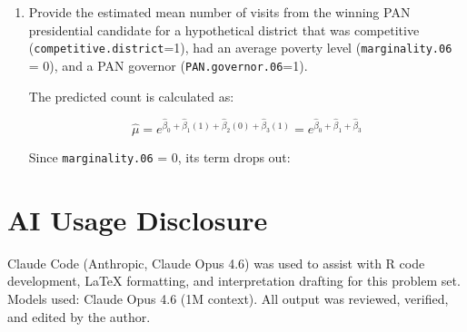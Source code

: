 \documentclass[12pt,letterpaper]{article}
\begin{document}
\begin{enumerate}
	\item [(c)]
	Provide the estimated mean number of visits from the winning PAN presidential candidate for a hypothetical district that was competitive (\texttt{competitive.district}=1), had an average poverty level (\texttt{marginality.06} = 0), and a PAN governor (\texttt{PAN.governor.06}=1).

\vspace{.25cm}


\vspace{.5cm}

The predicted count is calculated as:

$$\hat{\mu} = e^{\hat{\beta}_0 + \hat{\beta}_1(1) + \hat{\beta}_2(0) + \hat{\beta}_3(1)} = e^{\hat{\beta}_0 + \hat{\beta}_1 + \hat{\beta}_3}$$

Since \texttt{marginality.06} = 0, its term drops out:



\end{enumerate}

\section*{AI Usage Disclosure}
Claude Code (Anthropic, Claude Opus 4.6) was used to assist with R code development, \LaTeX{} formatting, and interpretation drafting for this problem set. Models used: Claude Opus 4.6 (1M context). All output was reviewed, verified, and edited by the author.
\end{document}
